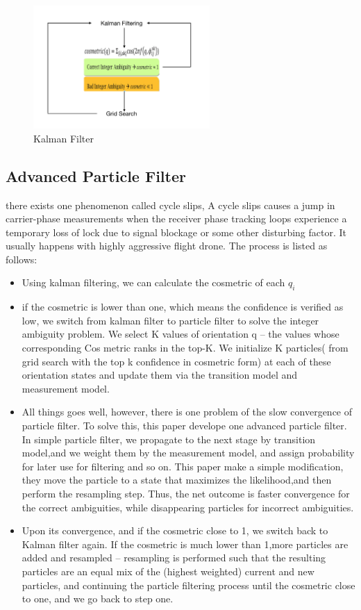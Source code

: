 \documentclass[journal,onecolumn]{IEEEtran}
\begin{document}
\begin{figure}
  \centering
  \captionsetup{justification=centering}
  \includegraphics[width=0.6\textwidth]{fig/kalman.png}
  \caption{Kalman Filter}
  \label{kalman}
\end{figure}
\subsection{Advanced Particle Filter}
there exists one phenomenon called cycle slips, A cycle slips causes a jump in
carrier-phase measurements when the receiver phase tracking loops experience a
temporary loss of lock due to signal blockage or some other disturbing factor.
It usually happens with highly aggressive flight drone. The process is listed as follows:
\begin{itemize}
\item Using kalman filtering, we can calculate the cosmetric of each $q_i$
\item if the cosmetric is lower than one, which means the confidence is verified as low,
we switch from kalman filter to particle filter to solve the integer ambiguity problem.
We select K values of orientation q – the values whose corresponding Cos metric ranks
in the top-K. We initialize K particles( from grid search with the top k confidence in
cosmetric form) at each of these orientation states and update them via the transition
model and measurement model.

\item All things goes well, however, there is one problem of the slow convergence
of particle filter. To solve this, this paper develope one advanced particle filter.
In simple particle filter, we propagate to the next stage by transition model,and we
weight them by the measurement model, and assign probability for later use for filtering
and so on. This paper make a simple modification, they move the particle to a state that
maximizes the likelihood,and then perform the resampling step. Thus, the net outcome is
faster convergence for the correct ambiguities, while disappearing particles for incorrect
ambiguities.

\item Upon its convergence, and if the cosmetric close to 1, we switch back to Kalman
filter again.  If the cosmetric is much lower than 1,more particles are added
and resampled – resampling is performed such that the resulting particles are
an equal mix of the (highest weighted) current and new particles, and continuing
the particle filtering process until the cosmetric close to one, and we go back to step one.
\end{itemize}
\end{document}
